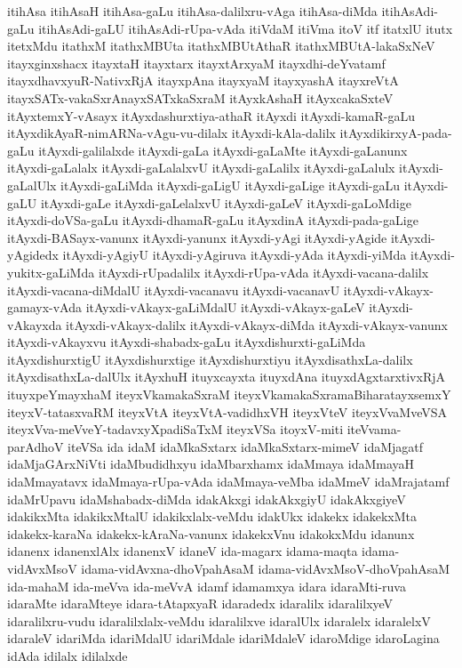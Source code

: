 {itihAsa
itihAsaH
itihAsa-gaLu
itihAsa-dalilxru-vAga
itihAsa-diMda
itihAsAdi-gaLu
itihAsAdi-gaLU
itihAsAdi-rUpa-vAda
itiVdaM
itiVma
itoV
itf
itatxlU
itutx
itetxMdu
itathxM
itathxMBUta
itathxMBUtAthaR
itathxMBUtA-lakaSxNeV
itayxginxshacx
itayxtaH
itayxtarx
itayxtArxyaM
itayxdhi-deYvatamf
itayxdhavxyuR-NativxRjA
itayxpAna
itayxyaM
itayxyashA
itayxreVtA
itayxSATx-vakaSxrAnayxSATxkaSxraM
itAyxkAshaH
itAyxcakaSxteV
itAyxtemxY-vAsayx
itAyxdashurxtiya-athaR
itAyxdi
itAyxdi-kamaR-gaLu
itAyxdikAyaR-nimARNa-vAgu-vu-dilalx
itAyxdi-kAla-dalilx
itAyxdikirxyA-pada-gaLu
itAyxdi-galilalxde
itAyxdi-gaLa
itAyxdi-gaLaMte
itAyxdi-gaLanunx
itAyxdi-gaLalalx
itAyxdi-gaLalalxvU
itAyxdi-gaLalilx
itAyxdi-gaLalulx
itAyxdi-gaLalUlx
itAyxdi-gaLiMda
itAyxdi-gaLigU
itAyxdi-gaLige
itAyxdi-gaLu
itAyxdi-gaLU
itAyxdi-gaLe
itAyxdi-gaLelalxvU
itAyxdi-gaLeV
itAyxdi-gaLoMdige
itAyxdi-doVSa-gaLu
itAyxdi-dhamaR-gaLu
itAyxdinA
itAyxdi-pada-gaLige
itAyxdi-BASayx-vanunx
itAyxdi-yanunx
itAyxdi-yAgi
itAyxdi-yAgide
itAyxdi-yAgidedx
itAyxdi-yAgiyU
itAyxdi-yAgiruva
itAyxdi-yAda
itAyxdi-yiMda
itAyxdi-yukitx-gaLiMda
itAyxdi-rUpadalilx
itAyxdi-rUpa-vAda
itAyxdi-vacana-dalilx
itAyxdi-vacana-diMdalU
itAyxdi-vacanavu
itAyxdi-vacanavU
itAyxdi-vAkayx-gamayx-vAda
itAyxdi-vAkayx-gaLiMdalU
itAyxdi-vAkayx-gaLeV
itAyxdi-vAkayxda
itAyxdi-vAkayx-dalilx
itAyxdi-vAkayx-diMda
itAyxdi-vAkayx-vanunx
itAyxdi-vAkayxvu
itAyxdi-shabadx-gaLu
itAyxdishurxti-gaLiMda
itAyxdishurxtigU
itAyxdishurxtige
itAyxdishurxtiyu
itAyxdisathxLa-dalilx
itAyxdisathxLa-dalUlx
itAyxhuH
ituyxcayxta
ituyxdAna
ituyxdAgxtarxtivxRjA
ituyxpeYmayxhaM
iteyxVkamakaSxraM
iteyxVkamakaSxramaBiharatayxsemxY
iteyxV-tatasxvaRM
iteyxVtA
iteyxVtA-vadidhxVH
iteyxVteV
iteyxVvaMveVSA
iteyxVva-meVveY-tadavxyXpadiSaTxM
iteyxVSa
itoyxV-miti
iteVvama-parAdhoV
iteVSa
ida
idaM
idaMkaSxtarx
idaMkaSxtarx-mimeV
idaMjagatf
idaMjaGArxNiVti
idaMbudidhxyu
idaMbarxhamx
idaMmaya
idaMmayaH
idaMmayatavx
idaMmaya-rUpa-vAda
idaMmaya-veMba
idaMmeV
idaMrajatamf
idaMrUpavu
idaMshabadx-diMda
idakAkxgi
idakAkxgiyU
idakAkxgiyeV
idakikxMta
idakikxMtalU
idakikxlalx-veMdu
idakUkx
idakekx
idakekxMta
idakekx-karaNa
idakekx-kAraNa-vanunx
idakekxVnu
idakokxMdu
idanunx
idanenx
idanenxlAlx
idanenxV
idaneV
ida-magarx
idama-maqta
idama-vidAvxMsoV
idama-vidAvxna-dhoVpahAsaM
idama-vidAvxMsoV-dhoVpahAsaM
ida-mahaM
ida-meVva
ida-meVvA
idamf
idamamxya
idara
idaraMti-ruva
idaraMte
idaraMteye
idara-tAtapxyaR
idaradedx
idaralilx
idaralilxyeV
idaralilxru-vudu
idaralilxlalx-veMdu
idaralilxve
idaralUlx
idaralelx
idaralelxV
idaraleV
idariMda
idariMdalU
idariMdale
idariMdaleV
idaroMdige
idaroLagina
idAda
idilalx
idilalxde
}
